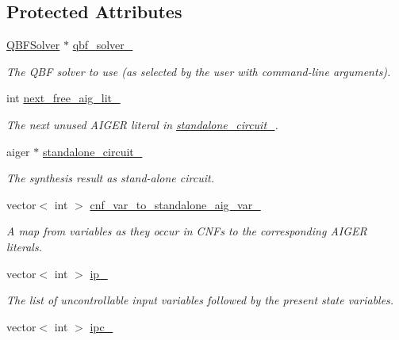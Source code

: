 \subsection*{Protected Attributes}
\begin{DoxyCompactItemize}
\item 
\hyperlink{classQBFSolver}{Q\-B\-F\-Solver} $\ast$ \hyperlink{classLearningImplExtractor_a4147358129fcfb9e72a0ee27d7c16f51}{qbf\-\_\-solver\-\_\-}
\begin{DoxyCompactList}\small\item\em The Q\-B\-F solver to use (as selected by the user with command-\/line arguments). \end{DoxyCompactList}\item 
int \hyperlink{classLearningImplExtractor_a987219dd3114957f2bd0d9df77a9d7fc}{next\-\_\-free\-\_\-aig\-\_\-lit\-\_\-}
\begin{DoxyCompactList}\small\item\em The next unused A\-I\-G\-E\-R literal in \hyperlink{classLearningImplExtractor_a17f7c47bf3e84fa5a70930e01a18deb2}{standalone\-\_\-circuit\-\_\-}. \end{DoxyCompactList}\item 
aiger $\ast$ \hyperlink{classLearningImplExtractor_a17f7c47bf3e84fa5a70930e01a18deb2}{standalone\-\_\-circuit\-\_\-}
\begin{DoxyCompactList}\small\item\em The synthesis result as stand-\/alone circuit. \end{DoxyCompactList}\item 
vector$<$ int $>$ \hyperlink{classLearningImplExtractor_a2d096ab7181fd608d6ee033f8c9ab8d3}{cnf\-\_\-var\-\_\-to\-\_\-standalone\-\_\-aig\-\_\-var\-\_\-}
\begin{DoxyCompactList}\small\item\em A map from variables as they occur in C\-N\-Fs to the corresponding A\-I\-G\-E\-R literals. \end{DoxyCompactList}\item 
vector$<$ int $>$ \hyperlink{classLearningImplExtractor_a5a4835eb5fc2df396272af43380ecc82}{ip\-\_\-}
\begin{DoxyCompactList}\small\item\em The list of uncontrollable input variables followed by the present state variables. \end{DoxyCompactList}\item 
vector$<$ int $>$ \hyperlink{classLearningImplExtractor_ab94459731d569bdd6bb0f3895fb9c184}{ipc\-\_\-}

\end{DoxyCompactItemize}
